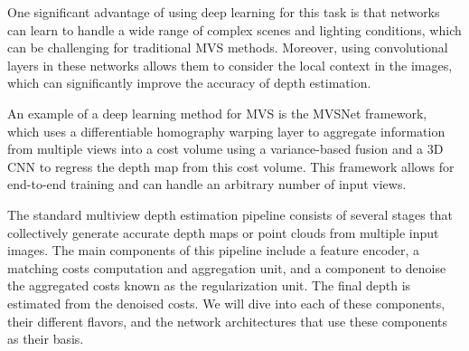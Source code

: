 One significant advantage of using deep learning for this task is that networks can learn to handle a wide range of complex scenes and lighting conditions, which can be challenging for traditional MVS methods. Moreover, using convolutional layers in these networks allows them to consider the local context in the images, which can significantly improve the accuracy of depth estimation.

An example of a deep learning method for MVS is the MVSNet framework, which uses a differentiable homography warping \cite{Yao2018} layer to aggregate information from multiple views into a cost volume using a variance-based fusion and a 3D CNN to regress the depth map from this cost volume. This framework allows for end-to-end training and can handle an arbitrary number of input views. 

The standard multiview depth estimation pipeline consists of several stages that collectively generate accurate depth maps or point clouds from multiple input images. The main components of this pipeline include a feature encoder, a matching costs computation and aggregation unit, and a component to denoise the aggregated costs known as the regularization unit. The final depth is estimated from the denoised costs. We will dive into each of these components, their different flavors, and the network architectures that use these components as their basis. 

